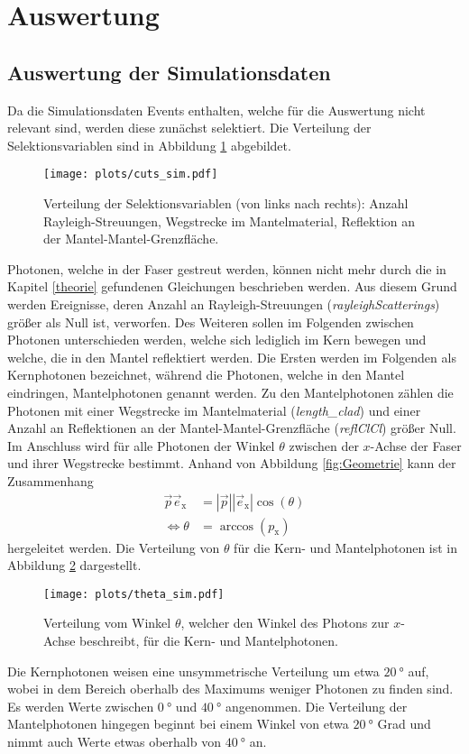 \section{Auswertung}

\subsection{Auswertung der Simulationsdaten}
Da die Simulationsdaten Events enthalten, welche für die Auswertung nicht relevant sind, werden diese zunächst selektiert. Die Verteilung der Selektionsvariablen sind in Abbildung \ref{fig:Cuts_sim} abgebildet.
\begin{figure}
    \centering
    \texttt{[image: plots/cuts\_sim.pdf]}
    \caption{Verteilung der Selektionsvariablen (von links nach rechts): Anzahl Rayleigh-Streuungen, Wegstrecke im Mantelmaterial, Reflektion an der Mantel-Mantel-Grenzfläche.}
    \label{fig:Cuts_sim}
  \end{figure}
  \FloatBarrier
Photonen, welche in der Faser gestreut werden, können nicht mehr durch die in Kapitel \ref{theorie} gefundenen Gleichungen beschrieben werden. Aus diesem Grund werden Ereignisse, deren Anzahl an Rayleigh-Streuungen (\textit{rayleighScatterings}) größer als Null ist, verworfen.
Des Weiteren sollen im Folgenden zwischen Photonen unterschieden werden, welche sich lediglich im Kern bewegen und welche, die in den Mantel reflektiert werden. Die Ersten werden im Folgenden als Kernphotonen bezeichnet, während die Photonen, welche in den Mantel eindringen, Mantelphotonen genannt werden.
Zu den Mantelphotonen zählen die Photonen mit einer Wegstrecke im Mantelmaterial (\textit{length\_clad}) und einer Anzahl an Reflektionen an der Mantel-Mantel-Grenzfläche (\textit{reflClCl}) größer Null. \\

Im Anschluss wird für alle Photonen der Winkel $\theta$ zwischen der $x$-Achse der Faser und ihrer Wegstrecke bestimmt. Anhand von Abbildung \ref{fig:Geometrie} kann der Zusammenhang
\begin{align}
    \vec{p}\vec{e}_{\mathrm{x}} &= |\vec{p}||\vec{e}_{\mathrm{x}}| \cos(\theta) \\
    \Leftrightarrow \theta &= \arccos(p_{\mathrm{x}})
\end{align}
hergeleitet werden. Die Verteilung von $\theta$ für die Kern- und Mantelphotonen ist in Abbildung \ref{fig:theta_sim} dargestellt.
\begin{figure}
    \centering
    \texttt{[image: plots/theta\_sim.pdf]}
    \caption{Verteilung vom Winkel $\theta$, welcher den Winkel des Photons zur $x$-Achse beschreibt, für die Kern- und Mantelphotonen.}
    \label{fig:theta_sim}
\end{figure}
\FloatBarrier
Die Kernphotonen weisen eine unsymmetrische Verteilung um etwa $\SI{20}{°}$ auf, wobei in dem Bereich oberhalb des Maximums weniger Photonen zu finden sind. Es werden Werte zwischen $\SI{0}{°}$ und $\SI{40}{°}$ angenommen. Die Verteilung der Mantelphotonen hingegen beginnt bei einem Winkel von etwa $\SI{20}{°}$ Grad und nimmt auch Werte etwas oberhalb von $\SI{40}{°}$ an.\\

